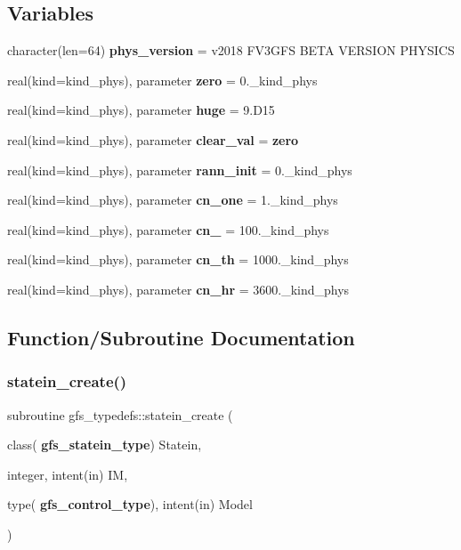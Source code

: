 \subsection*{Variables}
\begin{DoxyCompactItemize}
\item 
character(len=64) \textbf{ phys\+\_\+version} = \textquotesingle{}v2018 F\+V3\+G\+FS B\+E\+TA V\+E\+R\+S\+I\+ON P\+H\+Y\+S\+I\+CS\textquotesingle{}
\item 
real(kind=kind\+\_\+phys), parameter \textbf{ zero} = 0.\+\_\+kind\+\_\+phys
\item 
real(kind=kind\+\_\+phys), parameter \textbf{ huge} = 9.\+D15
\item 
real(kind=kind\+\_\+phys), parameter \textbf{ clear\+\_\+val} = \textbf{ zero}
\item 
real(kind=kind\+\_\+phys), parameter \textbf{ rann\+\_\+init} = 0.\+\_\+kind\+\_\+phys
\item 
real(kind=kind\+\_\+phys), parameter \textbf{ cn\+\_\+one} = 1.\+\_\+kind\+\_\+phys
\item 
real(kind=kind\+\_\+phys), parameter \textbf{ cn\+\_} = 100.\+\_\+kind\+\_\+phys
\item 
real(kind=kind\+\_\+phys), parameter \textbf{ cn\+\_\+th} = 1000.\+\_\+kind\+\_\+phys
\item 
real(kind=kind\+\_\+phys), parameter \textbf{ cn\+\_\+hr} = 3600.\+\_\+kind\+\_\+phys
\end{DoxyCompactItemize}


\subsection{Function/\+Subroutine Documentation}
\mbox{\label{namespacegfs__typedefs_ad5e5a6d8871401ae9b6949ef5dd0528f}} 
\subsubsection{statein\+\_\+create()}
{\footnotesize\ttfamily subroutine gfs\+\_\+typedefs\+::statein\+\_\+create (\begin{DoxyParamCaption}\item[{class(\textbf{ gfs\+\_\+statein\+\_\+type})}]{Statein,  }\item[{integer, intent(in)}]{IM,  }\item[{type(\textbf{ gfs\+\_\+control\+\_\+type}), intent(in)}]{Model }\end{DoxyParamCaption})}



